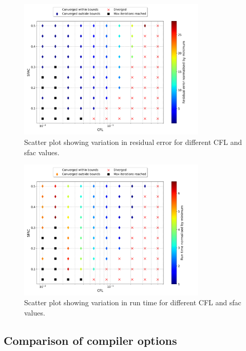 \documentclass{article}
\begin{document}
\begin{figure}
    \centering
    \includegraphics[width=0.8\textwidth]{figures/bend_cfl_sfac_residual.png}
    \caption{Scatter plot showing variation in residual error for different CFL and sfac values.}
    \label{fig:bend_cfl_sfac_residual}
\end{figure}

\begin{figure}[H]
    \centering
    \centering
    \includegraphics[width=0.8\textwidth]{figures/bend_cfl_sfac_time.png}
    \caption{Scatter plot showing variation in run time for different CFL and sfac values.}
    \label{fig:bend_cfl_sfac_time}
\end{figure}

\subsection{Comparison of compiler options }
\end{document}
